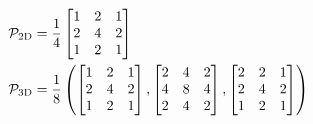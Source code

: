                     \begin{equation}
                        \centering
                        \begin{aligned}
                            \mathcal{P}_{2\text{D}} &= \frac{1}{4}
                            \begin{bmatrix}
                                1 & 2 & 1
                                \\
                                2 & 4 & 2
                                \\
                                1 & 2 & 1
                            \end{bmatrix}
                            \\
                            \mathcal{P}_{3\text{D}} &= \frac{1}{8} \left(
                            \begin{bmatrix}
                                1 & 2 & 1
                                \\
                                2 & 4 & 2
                                \\
                                1 & 2 & 1
                            \end{bmatrix}
                            ,
                            \begin{bmatrix}
                                2 & 4 & 2
                                \\
                                4 & 8 & 4
                                \\
                                2 & 4 & 2
                            \end{bmatrix}
                            ,
                            \begin{bmatrix}
                                2 & 2 & 1
                                \\
                                2 & 4 & 2
                                \\
                                1 & 2 & 1
                            \end{bmatrix}
                            \right)
                            \label{eq:prolongation_stencils}
                        \end{aligned}
                    \end{equation}
